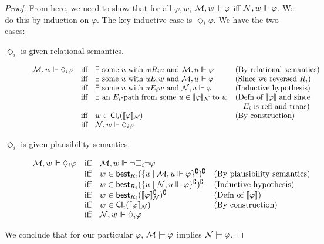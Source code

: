 \documentclass[letterpaper]{article}
\begin{document}
\begin{proof}
    From here, we need to show that for all $\varphi, w$, $\mathcal{M}, w \Vdash \varphi$ iff $\mathcal{N}, w \Vdash \varphi$.  We do this by induction on $\varphi$.  The key inductive case is $\Diamond_i \varphi$.  We have the two cases:
    \begin{description}
        \item[$\Diamond_i$ is given relational semantics.] 
        \[
        \begin{array}{lcll}
            \mathcal{M}, w \Vdash \Diamond_i \varphi & \mbox{iff} & \exists \mbox{ some } u \mbox{ with } w{R_i}u \mbox{ and } \mathcal{M}, u \Vdash \varphi & (\mbox{By relational semantics}) \\
            & \mbox{iff} & \exists \mbox{ some } u \mbox{ with } u{E_i}w \mbox{ and } \mathcal{M}, u \Vdash \varphi & (\mbox{Since we reversed } R_i) \\
            & \mbox{iff} & \exists \mbox{ some } u \mbox{ with } u{E_i}w \mbox{ and } \mathcal{N}, u \Vdash \varphi & (\mbox{Inductive hypothesis}) \\
            & \mbox{iff} & \exists \mbox{ an } E_i\mbox{-path from some } u \in [\![\mbox{\em $ \varphi $\/}]\!]_{\mathcal{N}} \mbox{ to } w & (\mbox{Defn of } [\![\mbox{\em $ \varphi $\/}]\!] \mbox{ and since } \\
            & & & \quad E_i \mbox{ is refl and trans}) \\
            & \mbox{iff} & w \in \mathsf{Cl}_i([\![\mbox{\em $ \varphi $\/}]\!]_{\mathcal{N}}) & (\mbox{By construction}) \\
            & \mbox{iff} & \mathcal{N}, w \Vdash \Diamond_i \varphi & 
        \end{array}
        \]
        
        \item[$\Diamond_i$ is given plausibility semantics.]
        \[
        \begin{array}{lcll}
            \mathcal{M}, w \Vdash \Diamond_i \varphi & \mbox{iff} & \mathcal{M}, w \Vdash \neg \Box_i \neg  \varphi & \\
            & \mbox{iff} & w \in \mathsf{best}_{R_i}(\{ u \mid \mathcal{M}, u \Vdash \varphi \}^\complement)^\complement & (\mbox{By plausibility semantics}) \\
            & \mbox{iff} & w \in \mathsf{best}_{R_i}(\{ u \mid \mathcal{N}, u \Vdash \varphi \}^\complement)^\complement & (\mbox{Inductive hypothesis})\\
            & \mbox{iff} & w \in \mathsf{best}_{R_i}([\![\mbox{\em $ \varphi $\/}]\!]_{\mathcal{N}}^\complement)^\complement & (\mbox{Defn of } [\![\mbox{\em $ \varphi $\/}]\!]) \\
            & \mbox{iff} & w \in \mathsf{Cl}_i([\![\mbox{\em $ \varphi $\/}]\!]_{\mathcal{N}}) & (\mbox{By construction}) \\
            & \mbox{iff} & \mathcal{N}, w \Vdash \Diamond_i \varphi & 
        \end{array}
        \]
    \end{description}
    We conclude that for our particular $\varphi$, $\mathcal{M} \models \varphi$ implies $\mathcal{N} \models \varphi$.
\end{proof}
\end{document}

